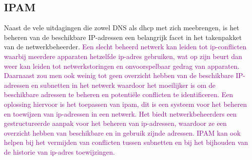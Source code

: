 \subsection{IPAM}
Naast de vele uitdagingen die zowel DNS als \acrshort{dhcp} met zich meebrengen, is het beheren van de beschikbare IP-adressen een belangrijk facet in het takenpakket van de netwerkbeheerder. \textcolor{purple}{Een slecht beheerd netwerk kan leiden tot \acrshort{ip}-conflicten waarbij meerdere apparaten hetzelfde \acrshort{ip}-adres gebruiken, wat op zijn beurt dan weer kan leiden tot netwerkstoringen en onvoorspelbaar gedrag van apparaten. Daarnaast zou men ook weinig tot geen overzicht hebben van de beschikbare IP-adressen en subnetten in het netwerk waardoor het moeilijker is om de beschikbare adressen te beheren en potentiële conflicten te identificeren.
    Een oplossing hiervoor is het toepassen van \acrshort{ipam}, dit is een systeem voor het beheren en toewijzen van \acrshort{ip}-adressen in een netwerk. Het biedt netwerkbeheerders een gestructureerde aanpak voor het beheren van \acrshort{ip}-adressen, waardoor ze een overzicht hebben van beschikbare en in gebruik zijnde adressen. IPAM kan ook helpen bij het vermijden van conflicten tussen subnetten en bij het bijhouden van de historie van \acrshort{ip}-adres toewijzingen.}



